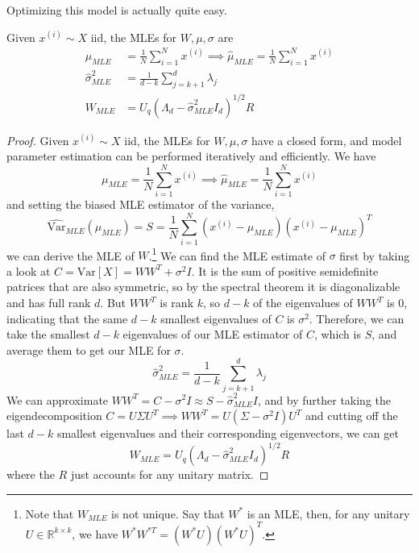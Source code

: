   Optimizing this model is actually quite easy. 

  \begin{theorem}
    Given $x^{(i)} \sim X$ iid, the MLEs for $W, \mu, \sigma$ are 
    \begin{align}
      \mu_{MLE} & = \frac{1}{N} \sum_{i=1}^N x^{(i)} \implies \hat{\mu}_{MLE} = \frac{1}{N} \sum_{i=1}^N x^{(i)} \\ 
      \hat{\sigma}^2_{MLE} & = \frac{1}{d-k} \sum_{j=k+1}^d \lambda_j \\
      W_{MLE} & = U_q (\Lambda_d - \hat{\sigma}_{MLE}^2 I_d )^{1/2} R
    \end{align}
  \end{theorem}
  \begin{proof}
    Given $x^{(i)} \sim X$ iid, the MLEs for $W, \mu, \sigma$ have a closed form, and model parameter estimation can be performed iteratively and efficiently. We have 
    \begin{equation}
      \mu_{MLE} = \frac{1}{N} \sum_{i=1}^N x^{(i)} \implies \hat{\mu}_{MLE} = \frac{1}{N} \sum_{i=1}^N x^{(i)}
    \end{equation}
    and setting the biased MLE estimator of the variance, 
    \begin{equation}
      \widehat{\mathrm{Var}}_{MLE}(\mu_{MLE}) = S = \frac{1}{N} \sum_{i=1}^N (x^{(i)} - \mu_{MLE}) (x^{(i)} - \mu_{MLE})^T
    \end{equation}
    we can derive the MLE of $W$.\footnote{Note that $W_{MLE}$ is not unique. Say that $W^\ast$ is an MLE, then, for any unitary $U \in \mathbb{R}^{k \times k}$, we have $W^\ast W^{\ast T} = (W^\ast U) (W^\ast U)^T$.} We can find the MLE estimate of $\sigma$ first by taking a look at $C = \mathrm{Var}[X] = W W^T + \sigma^2 I$. It is the sum of positive semidefinite patrices that are also symmetric, so by the spectral theorem it is diagonalizable and has full rank $d$. But $W W^T$ is rank $k$, so $d - k$ of the eigenvalues of $W W^T$ is $0$, indicating that the same $d-k$ smallest eigenvalues of $C$ is $\sigma^2$. Therefore, we can take the smallest $d-k$ eigenvalues of our MLE estimator of $C$, which is $S$, and average them to get our MLE for $\sigma$. 
    \begin{equation}
      \hat{\sigma}^2_{MLE} = \frac{1}{d-k} \sum_{j=k+1}^d \lambda_j
    \end{equation}
    We can approximate $W W^T = C - \sigma^2 I \approx S - \hat{\sigma}^2_{MLE} I$, and by further taking the eigendecomposition $C = U \Sigma U^T \implies W W^T = U (\Sigma - \sigma^2 I) U^T$ and cutting off the last $d-k$ smallest eigenvalues and their corresponding eigenvectors, we can get 
    \begin{equation}
      W_{MLE} = U_q (\Lambda_d - \hat{\sigma}_{MLE}^2 I_d )^{1/2} R
    \end{equation}
    where the $R$ just accounts for any unitary matrix. 
  \end{proof}

